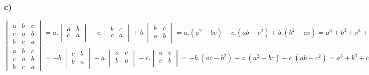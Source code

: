 \documentclass[11pt]{article}
\begin{document}
\subsubsection*{c)}
\[
\begin{vmatrix}
a & b & c \\
c & a & b \\
b & c & a
\end{vmatrix}
=
a.\begin{vmatrix}
a & b \\
c & a \\
\end{vmatrix}
-c.\begin{vmatrix}
b & c \\
c & a \\
\end{vmatrix}
+b.\begin{vmatrix}
b & c \\
a & b \\
\end{vmatrix}
=
a.(a^2-bc) - c.(ab-c^2) + b.(b^2-ac) = a^3+b^3+c^3 +3abc
\]
\[
\begin{vmatrix}
a & b & c \\
c & a & b \\
b & c & a
\end{vmatrix}
=
-b.\begin{vmatrix}
c & b \\
b & a \\
\end{vmatrix}
+a.\begin{vmatrix}
a & c \\
b & a \\
\end{vmatrix}
-c.\begin{vmatrix}
a & c \\
c & b \\
\end{vmatrix}
=
-b.(ac-b^2) + a.(a^2-bc) - c.(ab-c^2) = a^3+b^3+c^3 +3abc
\]
\end{document}

